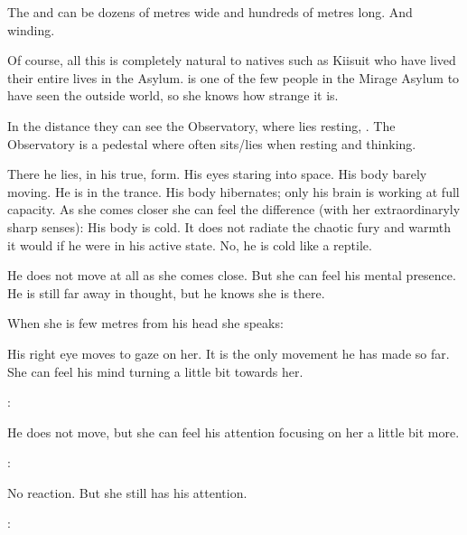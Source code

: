 The  and  can be dozens of metres wide and hundreds of metres long. 
And winding. 

Of course, all this is completely natural to natives such as Kiisuit who have lived their entire lives in the Asylum. 
\Criseis is one of the few people in the Mirage Asylum to have seen the outside world, so she knows how strange it is. 

In the distance they can see the Observatory, where \Ishnaruchaefir lies resting, . 
The Observatory is a pedestal where \Ishnaruchaefir often sits/lies when resting and thinking. 

There he lies, in his true, \draconic form. 
His eyes staring into space. 
His body barely moving. 
He is in the \ophidian trance. 
His body hibernates; only his brain is working at full capacity. 
As she comes closer she can feel the difference (with her extraordinaryly sharp senses): 
His body is cold. 
It does not radiate the chaotic fury and warmth it would if he were in his active state. 
No, he is cold like a reptile. 

He does not move at all as she comes close. 
But she can feel his mental presence. 
He is still far away in thought, but he knows she is there. 

When she is few metres from his head she speaks:

His right eye moves to gaze on her.
It is the only movement he has made so far. 
She can feel his mind turning a little bit towards her. 

\Criseis: 

He does not move, but she can feel his attention focusing on her a little bit more. 

\Criseis:

No reaction. 
But she still has his attention. 

\Criseis:

